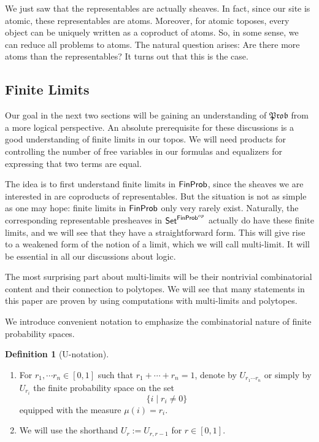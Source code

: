 \documentclass[a4paper]{amsproc}
\theoremstyle{plain}
\theoremstyle{definition}
\newtheorem{definition}[theorem]{Definition}
\theoremstyle{remark}
\numberwithin{equation}{section}
\newcommand{\Set}{\textup{\textsf{Set}}}
\newcommand{\FinProb}{\textup{\textsf{FinProb}}}
\newcommand{\Prob}{\mathfrak{Prob}}
\begin{document}
We just saw that the representables are actually sheaves. In fact, since our site is atomic, these representables are atoms. Moreover, for atomic toposes, every object can be uniquely written as a coproduct of atoms. So, in some sense, we can reduce all problems to atoms. The natural question arises: Are there more atoms than the representables? It turns out that this is the case.



\subsection{Finite Limits}

Our goal in the next two sections will be gaining an understanding of $\Prob$ from a more logical perspective. An absolute prerequisite for these discussions is a good understanding of finite limits in our topos. We will need products for controlling the number of free variables in our formulas and equalizers for expressing that two terms are equal.

The idea is to first understand finite limits in $\FinProb$, since the sheaves we are interested in are coproducts of representables. But the situation is not as simple as one may hope: finite limits in $\FinProb$ only very rarely exist. Naturally, the corresponding representable presheaves in $\Set^{\FinProb^{op}}$ actually do have these finite limits, and we will see that they have a straightforward form. This will give rise to a weakened form of the notion of a limit, which we will call multi-limit. It will be essential in all our discussions about logic.

The most surprising part about multi-limits will be their nontrivial combinatorial content and their connection to polytopes. We will see that many statements in this paper are proven by using computations with multi-limits and polytopes.

We introduce convenient notation to emphasize the combinatorial nature of finite probability spaces.

\begin{definition}[U-notation] \label{U-notation}
    \mbox{}
    \begin{enumerate}
        \item For $r_1, \cdots r_n \in [0,1]$ such that $r_1 + \cdots + r_n = 1$, denote by $U_{r_1 \cdots r_n}$ or simply by $U_{r_i}$ the finite probability space on the set
        \[
        \{i \mid r_i \neq 0 \}
        \]
        equipped with the measure $\mu(i) = r_i$.
        \item We will use the shorthand $U_r := U_{r,r-1}$ for $r \in [0,1]$.
    \end{enumerate}
\end{definition}
\end{document}
